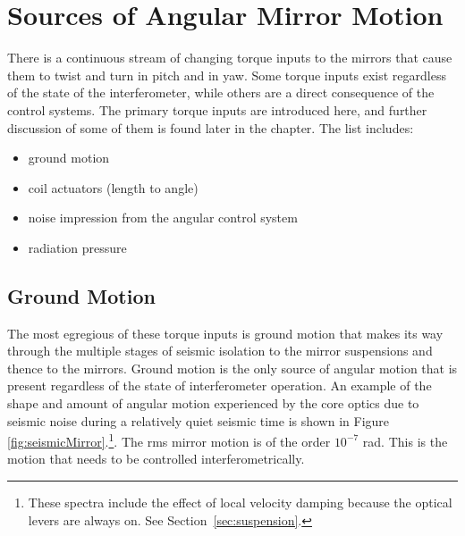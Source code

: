 \section{Sources of Angular Mirror Motion}
There is a continuous stream of changing torque inputs to the mirrors that cause them to twist and turn in pitch and in yaw. Some torque inputs exist regardless of the state of the interferometer, while others are a direct consequence of the control systems. The primary torque inputs are introduced here, and further discussion of some of them is found later in the chapter. The list includes:
\begin{itemize}
\item ground motion \vspace{-10pt} 
\item coil actuators (length to angle) \vspace{-10pt}
\item noise impression from the angular control system \vspace{-10pt}
\item radiation pressure
\end{itemize}




\subsection{Ground Motion} 
\label{sec:oplevspectra}
The most egregious of these torque inputs is ground motion that makes its way through the multiple stages of seismic isolation to the mirror suspensions and thence to the mirrors. Ground motion is the only source of angular motion that is present regardless of the state of interferometer operation. An example of the shape and amount of angular motion experienced by the core optics due to seismic noise during a relatively quiet seismic time is shown in Figure \ref{fig:seismicMirror}.\footnote{These spectra include the effect of local velocity damping because the optical levers are always on. See Section~\ref{sec:suspension}.}. The rms mirror motion is of the order $10^{-7}$ rad. This is the motion that needs to be controlled interferometrically.

